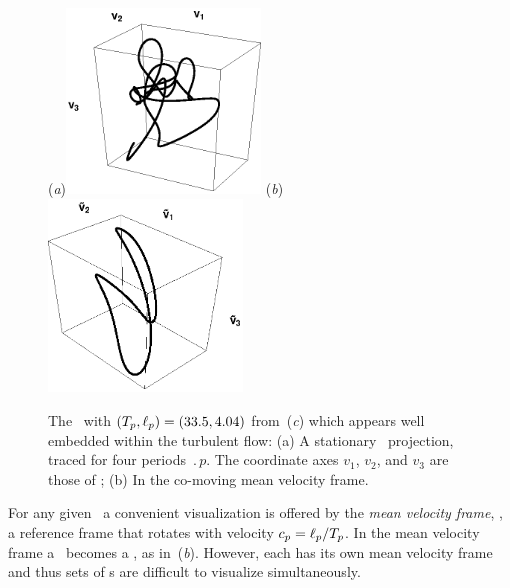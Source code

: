 \begin{figure}[t]
\begin{center}
(\textit{a})\includegraphics[width=0.46\textwidth, clip=true]{figs/ks22rpo033.50_04.045E2.eps}
(\textit{b})\includegraphics[width=0.46\textwidth, clip=true]{figs/ks22rpo033.50_04.045E2CM.eps}
\\
\end{center}
\caption{
 The
\rpo\ with $({T_{p}},\ell_p) =(33.5,4.04)$
from \,(\textit{c})
which appears well embedded within the turbulent flow:
 (a) A stationary \statesp\ projection,
  traced for four periods $\period{p}$. The coordinate axes
$v_1$, $v_2$, and $v_3$ are those of ;
 (b) In the co-moving mean velocity frame.
        } \label{f:MeanVelocityFrame}
\end{figure}

For any given \rpo\ a convenient visualization is
offered by the {\em mean velocity frame}, {\ie},
a reference frame that rotates with velocity
$c_p=\ell_p/{T_{p}}$.
In the mean velocity frame a \rpo\ becomes
a \po, as in \,(\textit{b}).
However, each {\rpo} has its own mean velocity frame and thus
sets of \rpo s are difficult to visualize simultaneously.

